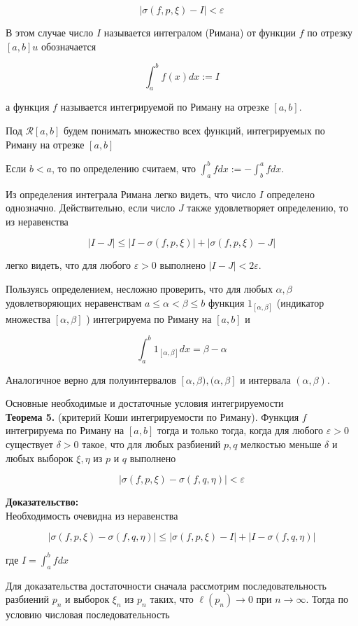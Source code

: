 \documentclass[a4paper,12pt]{article} %
\begin{document}
	$$
	|\sigma(f, p, \xi)-I|<\varepsilon
	$$
	
	В этом случае число $I$ называется интегралом (Римана) от функции $f$ по отрезку $[a, b] u$ обозначается
	
	$$
	\int_{a}^{b} f(x) d x:=I
	$$
	
	а функция $f$ называется интегрируемой по Риману на отрезке $[a, b]$.
	
	Под $\mathcal{R}[a, b]$ будем понимать множество всех функций, интегрируемых по Риману на отрезке $[a, b]$
	
	Если $b<a$, то по определению считаем, что $\int_{a}^{b} f d x:=-\int_{b}^{a} f d x$.
	
	Из определения интеграла Римана легко видеть, что число $I$ определено однозначно. Действительно, если число $J$ также удовлетворяет определению, то из неравенства
	
	$$
	|I-J| \leq|I-\sigma(f, p, \xi)|+|\sigma(f, p, \xi)-J|
	$$
	
	легко видеть, что для любого $\varepsilon>0$ выполнено $|I-J|<2 \varepsilon$.
	
	Пользуясь определением, несложно проверить, что для любых $\alpha, \beta$ удовлетворяющих неравенствам $a \leq \alpha<\beta \leq b$ функция $1_{[\alpha, \beta]}$ (индикатор множества $[\alpha, \beta]$ ) интегрируема по Риману на $[a, b]$ и
	
	$$
	\int_{a}^{b} 1_{[\alpha, \beta]} d x=\beta-\alpha
	$$
	
	Аналогичное верно для полуинтервалов $[\alpha, \beta),(\alpha, \beta]$ и интервала $(\alpha, \beta)$.
	
	Основные необходимые и достаточные условия интегрируемости\\
	\textbf{Теорема 5.} (критерий Коши интегрируемости по Риману). Функция $f$ интегрируема по Риману на $[a, b]$ тогда и только тогда, когда для любого $\varepsilon>0$ существует $\delta>0$ такое, что для любых разбиений $p, q$ мелкостью меньше $\delta$ и любых выборок $\xi, \eta$ из $p$ и $q$ выполнено
	
	$$
	|\sigma(f, p, \xi)-\sigma(f, q, \eta)|<\varepsilon
	$$
	
	\textbf{Доказательство:\\}
	Необходимость очевидна из неравенства
	
	$$
	|\sigma(f, p, \xi)-\sigma(f, q, \eta)| \leq|\sigma(f, p, \xi)-I|+|I-\sigma(f, q, \eta)|
	$$
	
	где $I=\int_{a}^{b} f d x$
	
	Для доказательства достаточности сначала рассмотрим последовательность разбиений $p_{n}$ и выборок $\xi_{n}$ из $p_{n}$ таких, что $\ell\left(p_{n}\right) \rightarrow 0$ при $n \rightarrow \infty$. Тогда по условию числовая последовательность
	
\end{document}
